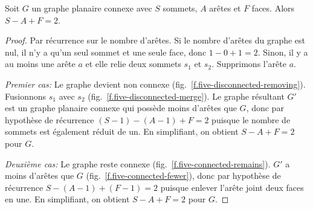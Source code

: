 \begin{theorem}\label{thm.euler} Soit $G$ un graphe planaire connexe avec $S$ sommets, $A$ arêtes et $F$ faces. Alors $S-A+F=2$.
\end{theorem}

\begin{proof}
Par récurrence sur le nombre d'arêtes. Si le nombre d'arêtes du graphe est nul, il n'y a qu'un seul sommet et une seule face, donc $1-0+1=2$. Sinon, il y a au moins une arête $a$ et elle relie deux sommets $s_1$ et $s_2$. Supprimons  l'arête $a$.

\textit{Premier cas:}
Le graphe devient non connexe (fig.~\ref{f.five-disconnected-removing}). Fusionnons $s_1$ avec $s_2$ (fig.~\ref{f.five-disconnected-merge}). Le graphe résultant $G'$ est un graphe planaire connexe qui  possède moins d'arêtes que $G$, donc par hypothèse de récurrence $(S-1)-(A-1)+F=2$ puisque le nombre de sommets est également réduit de un. En simplifiant, on obtient $S-A+F=2$ pour $G$.

\vspace{0.3cm}

\begin{minipage}{0.4\textwidth}
\centering   
{}
         \label{f.five-disconnected-removing}   
     \end{minipage}
     \hspace{3em}
     \begin{minipage}{0.4\textwidth}
\centering         
{}
         \label{f.five-disconnected-merge}
     \end{minipage}
     
\vspace{0.4cm}



\textit{Deuxième cas:}
Le graphe reste connexe (fig.~\ref{f.five-connected-remains}). $G'$ a moins d'arêtes que $G$ (fig.~\ref{f.five-connected-fewer}), donc par hypothèse de récurrence $S-(A-1)+(F-1)=2$ puisque enlever l'arête joint deux faces en une. En simplifiant, on obtient $S-A+F=2$ pour $G$.
\end{proof}

